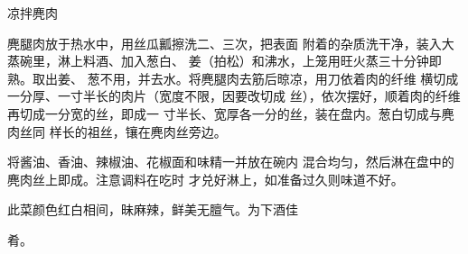 \begin{recipe}{凉拌麂肉}

\ingredients


\cooking

\step 麂腿肉放于热水中，用丝瓜瓤擦洗二、三次，把表面 附着的杂质洗干净，装入大蒸碗里，淋上料酒、加入葱白、 姜（拍松）和沸水，上笼用旺火蒸三十分钟即熟。取出姜、 葱不用，并去水。将麂腿肉去筋后晾凉，用刀依着肉的纤维 横切成一分厚、一寸半长的肉片（宽度不限，因要改切成 丝），依次摆好，顺着肉的纤维再切成一分宽的丝，即成一 寸半长、宽厚各一分的丝，装在盘内。葱白切成与麂肉丝同 样长的祖丝，镶在麂肉丝旁边。

\step 将酱油、香油、辣椒油、花椒面和味精一并放在碗内 混合均匀，然后淋在盘中的麂肉丝上即成。注意调料在吃时 才兑好淋上，如准备过久则味道不好。

\notes

此菜颜色红白相间，昧麻辣，鲜美无膻气。为下酒佳

肴。

\end{recipe}

